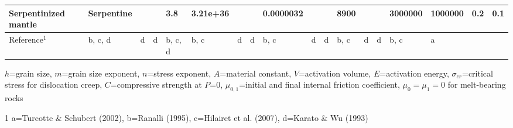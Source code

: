 \begin{landscape}
\begin{table}
{\begin{threeparttable}
\begin{tabular}[t]{llllllllllllllllll}
\addlinespace
Serpentinized mantle & Serpentine &  &  & 3.8 & 3.21e+36 &  &  & 0.0000032 &  &  & 8900 &  &  & 3000000 & 1000000 & 0.2 & 0.1\\
\midrule
Reference$^1$ & b, c, d & d & d & b, c, d & b, c & d & d & b, c & d & d & b, c & d & d & b, c & a &  & \\
\bottomrule
\end{tabular}
\begin{tablenotes}
\item $h$=grain size, $m$=grain size exponent, $n$=stress exponent, $A$=material constant, $V$=activation volume, $E$=activation energy, $\sigma_{cr}$=critical stress for dislocation creep, $C$=compressive strength at $P$=0, $\mu_{0,1}$=initial and final internal friction coefficient, $\mu_0=\mu_1=0$ for melt-bearing rocks
\item[1] a=Turcotte \& Schubert (2002),
        b=Ranalli (1995),
        c=Hilairet et al. (2007),
        d=Karato \& Wu (1993)
\end{tablenotes}
\end{threeparttable}}
\end{table}

\begin{table}


\end{table}
\end{landscape}
